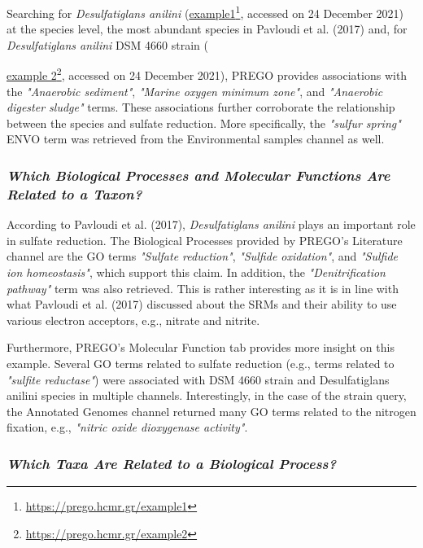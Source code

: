    Searching for \textit{Desulfatiglans anilini} (\href{https://prego.hcmr.gr/example1}{example1}\footnote{\href{https://prego.hcmr.gr/example1}{https://prego.hcmr.gr/example1}}, accessed on 24 December 2021) at the species level, 
   the most abundant species in Pavloudi et al. (2017) and, 
   for \textit{Desulfatiglans anilini} DSM 4660 strain ({\href{https://prego.hcmr.gr/example2}{example 2}\footnote{\href{https://prego.hcmr.gr/example2}{https://prego.hcmr.gr/example2}}, accessed on 24 December 2021), 
   PREGO provides associations with the \textit{"Anaerobic sediment"}, \textit{"Marine oxygen minimum zone"}, and \textit{"Anaerobic digester sludge"} terms. 
   These associations further corroborate the relationship between the species and sulfate reduction. 
   More specifically, the \textit{"sulfur spring"} ENVO term was retrieved from the Environmental samples channel as well.


   \subsubsection*{\textit{Which Biological Processes and Molecular Functions Are Related to a Taxon?}}
   \label{subsec:proc-taxa}

   According to Pavloudi et al. (2017), \textit{Desulfatiglans anilini} plays an important role in sulfate reduction. 
   The Biological Processes provided by PREGO's Literature channel are the GO terms \textit{"Sulfate reduction"}, \textit{"Sulfide oxidation"}, and \textit{"Sulfide ion homeostasis"}, which support this claim. 
   In addition, the \textit{"Denitrification pathway"} term was also retrieved. 
   This is rather interesting as it is in line with what Pavloudi et al. (2017) discussed about the SRMs and their ability to use various electron acceptors, e.g., nitrate and nitrite.

   Furthermore, PREGO's Molecular Function tab provides more insight on this example. Several GO terms related to sulfate reduction (e.g., terms related to \textit{"sulfite reductase"}) were associated with DSM 4660 strain and Desulfatiglans anilini species in multiple channels. Interestingly, in the case of the strain query, the Annotated Genomes channel returned many GO terms related to the nitrogen fixation, e.g., \textit{"nitric oxide dioxygenase activity"}.


   \subsubsection*{\textit{Which Taxa Are Related to a Biological Process?}}
   \label{subsec:taxa-proces}

}
